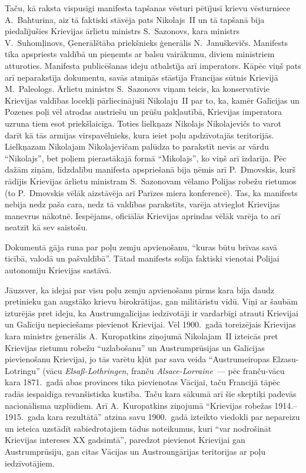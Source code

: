 \documentclass[twoside,a5paper,12pt,fleqn,openany]{extbook}
\newcommand{\detxti}[1]{\textit{\textgerman{#1}}}
\newcommand{\frtxti}[1]{\textit{\textfrench{#1}}}
\begin{document}
Taču, kā raksta vispusīgi manifesta tapšanas vēsturi pētījusī krievu vēsturniece A.~Bahturina, aiz tā faktiski stāvēja pats Nikolajs~II un tā tapšanā bija piedalījušies Krievijas ārlietu ministrs S.~Sazonovs, kara ministrs V.~Suhomļinovs, Ģenerālštāba priekšnieks ģenerālis N.~Januškevičs. Manifests tika apspriests valdībā un pieņemts ar balsu vairākumu, diviem ministriem atturoties. Manifesta publicēšanas ideju atbalstīja arī imperators. Kāpēc viņš pats arī neparakstīja dokumentu, savās atmiņās stāstīja Francijas sūtnis Krievijā M.~Paleologs. Ārlietu ministrs S.~Sazonovs viņam teicis, ka konservatīvie Krievijas valdības locekļi pārliecinājuši Nikolaju~II par to, ka, kamēr Galīcijas un Pozenes poļi vēl atrodas austriešu un prūšu pakļautībā, Krievijas imperatora uzruna tiem esot priekšlaicīga. Toties lielkņazs Nikolajs Nikolajevičs to varot darīt kā tās armijas virspavēlnieks, kura ieiet poļu apdzīvotajās teritorijās. Lielkņazam Nikolajam Nikolajevičam palūdza to parakstīt nevis ar vārdu ``Nikolajs'', bet poļiem pierastākajā formā ``Mikolajs'', ko viņš arī izdarīja. Pēc dažām ziņām, līdzdalību manifesta apspriešanā bija ņēmis arī P.~Dmovskis, kurš rādījis Krievijas ārlietu ministram S.~Sazonovam vēlamo Polijas robežu rietumos (to P.~Dmovskis vēlāk aizstāvēja arī Parīzes miera konferencē). Tas, ka manifests nebija nedz paša cara, nedz tā valdības parakstīts, varēja atvieglot Krievijas manevrus nākotnē. Iespējams, oficiālās Krievijas aprindas vēlāk varēja to arī neatzīt kā sev saistošu.

Dokumentā gāja runa par poļu zemju apvienošanu, ``kuras būtu brīvas savā ticībā, valodā un pašvaldībā''. Tātad manifests solīja faktiski vienotai Polijai autonomiju Krievijas sastāvā.

Jāuzsver, ka idejai par visu poļu zemju apvienošanu pirms kara bija daudz pretinieku gan augstāko krievu birokrātijas, gan militāristu vidū. Viņi ar šaubām izturējās pret ideju, ka Austrumgalīcijas iedzīvotāji ir vardarbīgi atrauti Krievijai un Galīciju nepieciešams pievienot Krievijai. Vēl 1900.~gadā toreizējais Krievijas kara ministrs ģenerālis A.~Kuropatkins ziņojumā Nikolajam~II izteicās pret Krievijas rietumu robežu ``uzlabošanu'' un Austrumprūsijas un Galīcijas pievienošanu Krievijai, jo tās varētu kļūt par sava veida ``Austrumeiropas Elzasu-Lotringu'' (vācu \detxti{Elsaß-Lothringen}, franču \frtxti{Alsace-Lorraine}~--- pēc franču-vācu kara 1871.~gadā abas provinces tika pievienotas Vācijai, taču Francijā tāpēc radās iespaidīga revanšistiska kustība. Taču kara sākumā arī šie skeptiķi padevās nacionālisma uzplūdiem. Arī A.~Kuropatkins ziņojumā ``Krievijas robežas 1914.--1915.~gada kara rezultātā'' atzina savu 1900.~gadā izteikto viedokli par nepareizu un ieteica uzstādīt sabiedrotajiem tādus noteikumus, kuri ``var nodrošināt Krievijas intereses XX gadsimtā'', paredzot pievienot Krievijai gan Austrumprūsiju, gan citas Vācijas un Austroungārijas teritorijas ar poļu iedzīvotājiem.
\end{document}

